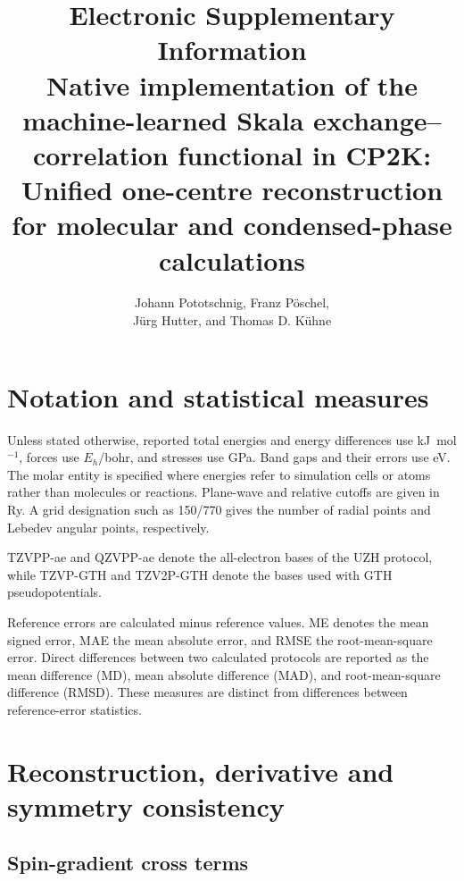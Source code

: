 \documentclass[10pt,a4paper]{article}
\title{Electronic Supplementary Information\\[6pt]\large Native implementation of the machine-learned Skala exchange--correlation functional in CP2K: Unified one-centre reconstruction for molecular and condensed-phase calculations}
\author{Johann Pototschnig, Franz P\"oschel,\\J\"urg Hutter, and Thomas D. K\"uhne}
\date{}
\begin{document}
\maketitle
\tableofcontents
\clearpage

\section{Notation and statistical measures}
\label{sec:scope}

Unless stated otherwise, reported total energies and energy differences use kJ~mol$^{-1}$, forces use $E_h$/bohr, and stresses use GPa. Band gaps and their errors use eV. The molar entity is specified where energies refer to simulation cells or atoms rather than molecules or reactions. Plane-wave and relative cutoffs are given in Ry. A grid designation such as 150/770 gives the number of radial points and Lebedev angular points, respectively.

TZVPP-ae and QZVPP-ae denote the all-electron bases of the UZH protocol, while TZVP-GTH and TZV2P-GTH denote the bases used with GTH pseudopotentials.

Reference errors are calculated minus reference values. ME denotes the mean signed error, MAE the mean absolute error, and RMSE the root-mean-square error. Direct differences between two calculated protocols are reported as the mean difference (MD), mean absolute difference (MAD), and root-mean-square difference (RMSD). These measures are distinct from differences between reference-error statistics.

\section{Reconstruction, derivative and symmetry consistency}
\label{sec:reconstruction}

\subsection{Spin-gradient cross terms}
\label{sec:spin-gradients}
\end{document}
